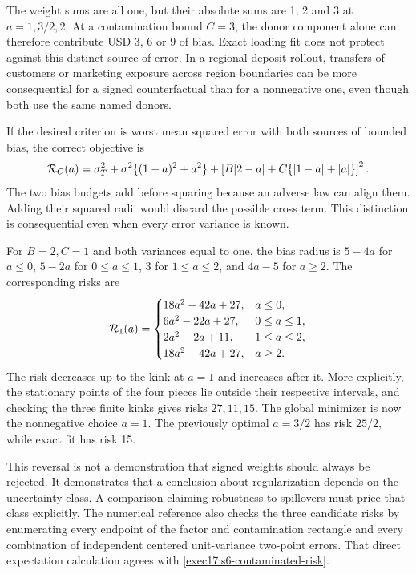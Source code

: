 The weight sums are all one, but their absolute sums are 1, 2 and 3
at $a=1,3/2,2$. At a contamination bound $C=3$, the donor component
alone can therefore contribute USD 3, 6 or 9 of bias. Exact loading fit
does not protect against this distinct source of error. In a regional
deposit rollout, transfers of customers or marketing exposure across region
boundaries can be more consequential for a signed counterfactual than for
a nonnegative one, even though both use the same named donors.

If the desired criterion is worst mean squared error with both sources of
bounded bias, the correct objective is
\begin{equation}
 {\cal R}_C(a)=\sigma_T^2+\sigma^2\{(1-a)^2+a^2\}
       +\left[B|2-a|+C\{|1-a|+|a|\}\right]^2.
 \label{exec17:s6-contaminated-risk}
\end{equation}
The two bias budgets add before squaring because an adverse law can align
them. Adding their squared radii would discard the possible cross term.
This distinction is consequential even when every error variance is known.

For $B=2,C=1$ and both variances equal to one, the bias radius is
$5-4a$ for $a\leq0$, $5-2a$ for $0\leq a\leq1$, 3 for
$1\leq a\leq2$, and $4a-5$ for $a\geq2$. The corresponding risks are
\begin{equation}
 {\cal R}_1(a)=
 \begin{cases}
 18a^2-42a+27,&a\leq0,\\
 6a^2-22a+27,&0\leq a\leq1,\\
 2a^2-2a+11,&1\leq a\leq2,\\
 18a^2-42a+27,&a\geq2.
 \end{cases}
 \label{exec17:s6-contaminated-pieces}
\end{equation}
The risk decreases up to the kink at $a=1$ and increases after it.
More explicitly, the stationary points of the four pieces lie outside
their respective intervals, and checking the three finite kinks gives
risks $27,11,15$. The global minimizer is now the nonnegative choice
$a=1$. The previously optimal $a=3/2$ has risk $25/2$, while
exact fit has risk 15.

This reversal is not a demonstration that signed weights should always be
rejected. It demonstrates that a conclusion about regularization depends
on the uncertainty class. A comparison claiming robustness to spillovers
must price that class explicitly. The numerical reference also checks the
three candidate risks by enumerating every endpoint of the factor and
contamination rectangle and every combination of independent centered
unit-variance two-point errors. That direct expectation calculation agrees
with \eqref{exec17:s6-contaminated-risk}.~\citep{exec17_s6_math}

